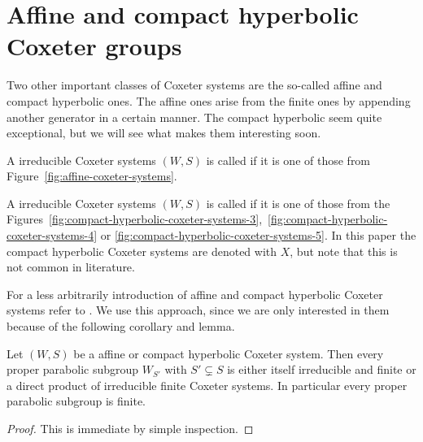 \section{Affine and compact hyperbolic Coxeter groups}
\label{sec:coxeter-groups-affine-compact-hyperbolic}

Two other important classes of Coxeter systems are the so-called affine and compact hyperbolic ones. The affine ones arise from the finite ones by appending another generator in a certain manner. The compact hyperbolic seem quite exceptional, but we will see what makes them interesting soon.

\begin{defi}
	A irreducible Coxeter systems $(W,S)$ is called  if it is one of those from Figure~\ref{fig:affine-coxeter-systems}.
\end{defi}

\begin{defi}
	A irreducible Coxeter systems $(W,S)$ is called  if it is one of those from the Figures~\ref{fig:compact-hyperbolic-coxeter-systems-3},~\ref{fig:compact-hyperbolic-coxeter-systems-4} or \ref{fig:compact-hyperbolic-coxeter-systems-5}. In this paper the compact hyperbolic Coxeter systems are denoted with $X$, but note that this is not common in literature.
\end{defi}

For a less arbitrarily introduction of affine and compact hyperbolic Coxeter systems refer to \cite[Section 2.5, 6.7 -- 6.9]{humphreys:coxeter}. We use this approach, since we are only interested in them because of the following corollary and lemma.

\begin{coro}
	Let $(W,S)$ be a affine or compact hyperbolic Coxeter system. Then every proper parabolic subgroup $W_{S'}$ with $S' \subsetneq S$ is either itself irreducible and finite or a direct product of irreducible finite Coxeter systems. In particular every proper parabolic subgroup is finite.

	\begin{proof}
		This is immediate by simple inspection.
	\end{proof}
\end{coro}

